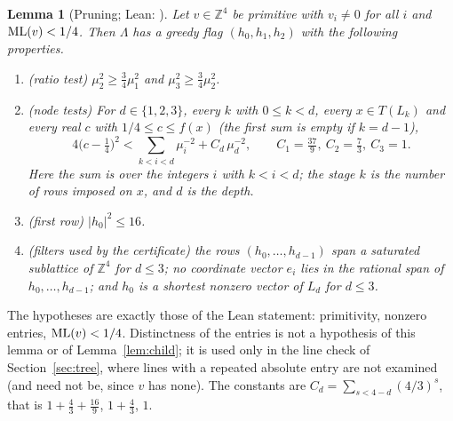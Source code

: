 \documentclass[11pt]{article}
\newtheorem{lemma}[theorem]{Lemma}
\theoremstyle{remark}
\newcommand{\Z}{\mathbb{Z}}
\newcommand{\lean}[1]{{\small\texttt{\detokenize{#1}}}}
\begin{document}
\begin{lemma}[Pruning; Lean: \lean{L4S3.exists_flag_accepted}]\label{lem:prune}
Let $v\in\Z^4$ be primitive with $v_i\ne0$ for all $i$ and $\mathrm{ML}(v)<1/4$. Then $\Lambda$ has a greedy flag $(h_0,h_1,h_2)$ with the following properties.
\begin{enumerate}
\item[(a)] (ratio test) $\mu_2^2\ge\tfrac34\mu_1^2$ and $\mu_3^2\ge\tfrac34\mu_2^2$.
\item[(b)] (node tests) For $d\in\{1,2,3\}$, every $k$ with $0\le k<d$, every $x\in T(L_k)$ and every real $c$ with $1/4\le c\le f(x)$ (the first sum is empty if $k=d-1$),
\[
4\bigl(c-\tfrac14\bigr)^2<\sum_{k<i<d}\mu_i^{-2}+C_d\,\mu_d^{-2},\qquad C_1=\tfrac{37}{9},\ C_2=\tfrac73,\ C_3=1 .
\]
Here the sum is over the integers $i$ with $k<i<d$; the stage $k$ is the number of rows imposed on $x$, and $d$ is the depth.
\item[(c)] (first row) $|h_0|^2\le16$.
\item[(d)] (filters used by the certificate) the rows $(h_0,\dots,h_{d-1})$ span a saturated sublattice of $\Z^4$ for $d\le3$; no coordinate vector $e_i$ lies in the rational span of $h_0,\dots,h_{d-1}$; and $h_0$ is a shortest nonzero vector of $L_d$ for $d\le3$.
\end{enumerate}
\end{lemma}
The hypotheses are exactly those of the Lean statement: primitivity, nonzero entries, $\mathrm{ML}(v)<1/4$. Distinctness of the entries is not a hypothesis of this lemma or of Lemma~\ref{lem:child}; it is used only in the line check of Section~\ref{sec:tree}, where lines with a repeated absolute entry are not examined (and need not be, since $v$ has none). The constants are $C_d=\sum_{s<4-d}(4/3)^s$, that is $1+\frac43+\frac{16}9$, $1+\frac43$, $1$.
\end{document}
